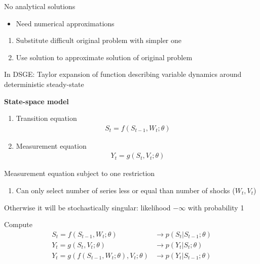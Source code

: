 \documentclass{beamer}
\begin{document}
\begin{frame} 
  No analytical solutions
  \begin{itemize}
    \item Need numerical approximations
  \end{itemize}
  \medskip
  \begin{enumerate}
    \item Substitute difficult original problem with simpler one
    \item Use solution to approximate solution of original problem
  \end{enumerate}
  In DSGE: Taylor expansion of function describing variable dynamics around deterministic steady-state
\end{frame}


\begin{frame}
  \textbf{State-space model}
  \begin{enumerate}
    \item Transition equation
    \begin{align*}
      S_t=f(S_{t-1}, W_t; \theta)
    \end{align*}
    \item Measurement equation
    \begin{align*}
      Y_t=g(S_t, V_t;\theta)
    \end{align*}
  \end{enumerate}
  \medskip
  Measurement equation subject to one restriction
  \begin{enumerate}
    \item Can only select number of series less or equal than number of shocks ($W_t,V_t$)
  \end{enumerate}
  Otherwise it will be stochastically singular: likelihood $-\infty$ with probability 1
\end{frame}

\begin{frame}
  Compute
  \begin{align}
    S_t=f(S_{t-1}, W_t; \theta) &\rightarrow p(S_t|S_{t-1};\theta)\\
    Y_t=g(S_t, V_t;\theta) &\rightarrow p(Y_t|S_t;\theta)\\
    Y_t=g(f(S_{t-1},W_t;\theta),V_t;\theta) &\rightarrow p(Y_t|S_{t-1};\theta)
  \end{align}
  
\end{frame}
\end{document}
